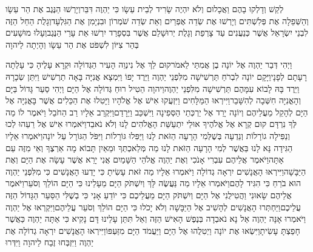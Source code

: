 \documentclass[../main/main.tex]{subfiles}
\begin{document}
\begin{multicols*}{\ncols}
לְקַשׁ וְדָלְקוּ בָהֶם וַאֲכָלוּם וְלֹא יִהְיֶה שָׂרִיד לְבֵית עֵשָׂו כִּי יַהְוֶה דִּבֵּר\PreVerseSpace{}וְיָרְשׁוּ הַנֶּגֶב אֶת הַר עֵשָׂו וְהַשְּׁפֵלָה אֶת פְּלִשְׁתִּים וְיָרְשׁוּ אֶת שְׂדֵה אֶפְרַיִם וְאֵת שְׂדֵה שֹׁמְרוֹן וּבִנְיָמִן אֶת הַגִּלְעָד\PreVerseSpace{}וְגָלֻת הַחֵל הַזֶּה לִבְנֵי יִשְׂרָאֵל אֲשֶׁר כְּנַעֲנִים עַד צָרְפַת וְגָלֻת יְרוּשָׁלֵם אֲשֶׁר בִּסְפָרַד יִרְשׁוּ אֵת עָרֵי הַנֶּגֶב\PreVerseSpace{}וְעָלוּ מוּשָׁעִים\SubEnd{} בְּהַר צִיּוֹן לִשְׁפֹּט אֶת הַר עֵשָׂו וְהָיְתָה לַיהוָה\par
\end{multicols*}
\pagebreak
{}
\begin{multicols*}{\ncols}
וַיְהִי דְּבַר יַהְוֶה אֶל יוֹנָה בֶן אֲמִתַּי לֵאמֹר\PreVerseSpace{}קוּם לֵךְ אֶל נִינְוֵה הָעִיר הַגְּדוֹלָה וּקְרָא עָלֶיהָ כִּי עָלְתָה רָעָתָם לְפָנָי\PreVerseSpace{}וַיָּקָם יוֹנָה לִבְרֹחַ תַּרְשִׁישָׁה מִלִּפְנֵי יַהְוֶה וַיֵּרֶד יָפוֹ וַיִּמְצָא אֳנִיָּה בָּאָה תַרְשִׁישׁ וַיִּתֵּן שְׂכָרָהּ וַיֵּרֶד בָּהּ לָבוֹא עִמָּהֶם תַּרְשִׁישָׁה מִלִּפְנֵי יַהְוֶה\PreVerseSpace{}וַיהוָה הֵטִיל רוּחַ גְּדוֹלָה אֶל הַיָּם וַיְהִי סַעַר גָּדוֹל בַּיָּם וְהָאֳנִיָּה חִשְּׁבָה לְהִשָּׁבֵר\PreVerseSpace{}וַיִּירְאוּ הַמַּלָּחִים וַיִּזְעֲקוּ אִישׁ אֶל אֱלֹהָיו וַיָּטִלוּ אֶת הַכֵּלִים אֲשֶׁר בָּאֳנִיָּה אֶל הַיָּם לְהָקֵל מֵעֲלֵיהֶם וְיוֹנָה יָרַד אֶל יַרְכְּתֵי הַסְּפִינָה וַיִּשְׁכַּב וַיֵּרָדַם\PreVerseSpace{}וַיִּקְרַב אֵלָיו רַב הַחֹבֵל וַיֹּאמֶר לוֹ מַה לְּךָ נִרְדָּם קוּם קְרָא אֶל אֱלֹהֶיךָ אוּלַי יִתְעַשֵּׁת הָאֱלֹהִים לָנוּ וְלֹא נֹאבֵד\PreVerseSpace{}וַיֹּאמְרוּ אִישׁ אֶל רֵעֵהוּ לְכוּ וְנַפִּילָה גוֹרָלוֹת וְנֵדְעָה בְּשֶׁלְּמִי הָרָעָה הַזֹּאת לָנוּ וַיַּפִּלוּ גּוֹרָלוֹת וַיִּפֹּל הַגּוֹרָל עַל יוֹנָה\PreVerseSpace{}וַיֹּאמְרוּ אֵלָיו הַגִּידָה נָּא לָנוּ בַּאֲשֶׁר לְמִי הָרָעָה הַזֹּאת לָנוּ מַה מְּלַאכְתְּךָ וּמֵאַיִן תָּבוֹא מָה אַרְצֶךָ וְאֵי מִזֶּה עַם אָתָּה\PreVerseSpace{}וַיֹּאמֶר אֲלֵיהֶם עִבְרִי אָנֹכִי וְאֶת יַהְוֶה אֱלֹהֵי הַשָּׁמַיִם אֲנִי יָרֵא אֲשֶׁר עָשָׂה אֶת הַיָּם וְאֶת הַיַּבָּשָׁה\PreVerseSpace{}וַיִּירְאוּ הָאֲנָשִׁים יִרְאָה גְדוֹלָה וַיֹּאמְרוּ אֵלָיו מַה זֹּאת עָשִׂיתָ כִּי יָדְעוּ הָאֲנָשִׁים כִּי מִלִּפְנֵי יַהְוֶה הוּא בֹרֵחַ כִּי הִגִּיד לָהֶם\PreVerseSpace{}וַיֹּאמְרוּ אֵלָיו מַה נַּעֲשֶׂה לָּךְ וְיִשְׁתֹּק הַיָּם מֵעָלֵינוּ כִּי הַיָּם הוֹלֵךְ וְסֹעֵר\PreVerseSpace{}וַיֹּאמֶר אֲלֵיהֶם שָׂאוּנִי וַהֲטִילֻנִי אֶל הַיָּם וְיִשְׁתֹּק הַיָּם מֵעֲלֵיכֶם כִּי יוֹדֵעַ אָנִי כִּי בְשֶׁלִּי הַסַּעַר הַגָּדוֹל הַזֶּה עֲלֵיכֶם\PreVerseSpace{}וַיַּחְתְּרוּ הָאֲנָשִׁים לְהָשִׁיב אֶל הַיַּבָּשָׁה וְלֹא יָכֹלוּ כִּי הַיָּם הוֹלֵךְ וְסֹעֵר עֲלֵיהֶם\PreVerseSpace{}וַיִּקְרְאוּ אֶל יַהְוֶה וַיֹּאמְרוּ אָנָּה יַהְוֶה אַל נָא נֹאבְדָה בְּנֶפֶשׁ הָאִישׁ הַזֶּה וְאַל תִּתֵּן עָלֵינוּ דָּם נָקִיא כִּי אַתָּה יַהְוֶה כַּאֲשֶׁר חָפַצְתָּ עָשִׂיתָ\PreVerseSpace{}וַיִּשְׂאוּ אֶת יוֹנָה וַיְטִלֻהוּ אֶל הַיָּם וַיַּעֲמֹד הַיָּם מִזַּעְפּוֹ\PreVerseSpace{}וַיִּירְאוּ הָאֲנָשִׁים יִרְאָה גְדוֹלָה אֶת יַהְוֶה וַיִּזְבְּחוּ זֶבַח לַיהוָה וַיִּדְּרוּ 
\end{multicols*}
\end{document}
